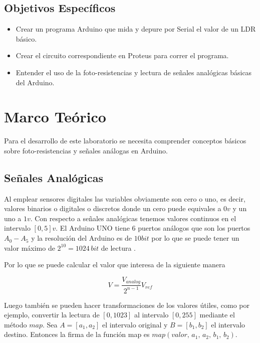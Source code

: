 \documentclass{article}
\begin{document}
    \subsection{Objetivos Específicos}

    \begin{itemize}
        \item Crear un programa Arduino que mida y depure por Serial el valor de un LDR básico.
        \item Crear el circuito correspondiente en Proteus para correr el programa.
        \item Entender el uso de la foto-resistencias y lectura de señales analógicas básicas del Arduino.
    \end{itemize}

    \section{Marco Teórico}

    Para el desarrollo de este laboratorio se necesita comprender conceptos básicos sobre foto-resistencias y señales análogas en Arduino.

    \subsection{Señales Analógicas}

    Al emplear sensores digitales las variables obviamente son cero o uno, es decir, valores binarios o digitales o discretos donde un cero puede equivales a $0v$ y un uno a $1v$. Con respecto a señales analógicas tenemos valores continuos en el intervalo $[0, 5]v$. El Arduino UNO tiene 6 puertos análogos que son los puertos $A_0 - A_5$ y la resolución del Arduino es de $10 bit$ por lo que se puede tener un valor máximo de $2^{10} = 1024 \, bit$ de lectura \cite{flores-2018}.

    \bigbreak

    Por lo que se puede calcular el valor que interesa de la siguiente manera

    $$
    V = \frac{V_{analog}}{2^{n-1}} V_{ref}
    $$

    Luego también se pueden hacer transformaciones de los valores útiles, como por ejemplo, convertir la lectura de $[0, 1023]$ al intervalo $[0, 255]$ mediante el método $map$. Sea $A = [a_1, a_2]$ el intervalo original y $B = [b_1, b_2]$ el intervalo destino. Entonces la firma de la función map es $map(valor, \, a_1, \, a_2, \, b_1, \, b_2)$.
\end{document}

